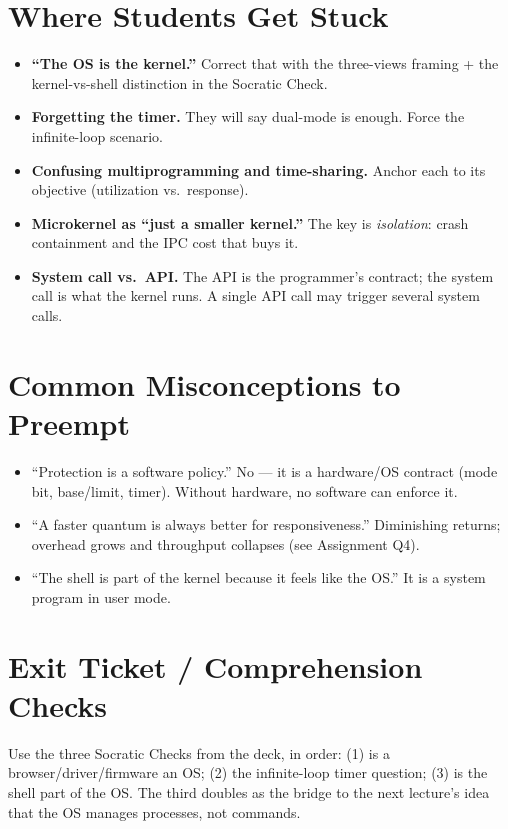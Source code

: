 \documentclass[11pt]{article}
\begin{document}
\section{Where Students Get Stuck}

\begin{itemize}
  \item \textbf{``The OS is the kernel.''} Correct that with the three-views framing + the kernel-vs-shell distinction in the Socratic Check.
  \item \textbf{Forgetting the timer.} They will say dual-mode is enough. Force the infinite-loop scenario.
  \item \textbf{Confusing multiprogramming and time-sharing.} Anchor each to its objective (utilization vs.\ response).
  \item \textbf{Microkernel as ``just a smaller kernel.''} The key is \emph{isolation}: crash containment and the IPC cost that buys it.
  \item \textbf{System call vs.\ API.} The API is the programmer's contract; the system call is what the kernel runs. A single API call may trigger several system calls.
\end{itemize}

\section{Common Misconceptions to Preempt}

\begin{itemize}
  \item ``Protection is a software policy.'' No --- it is a hardware/OS contract (mode bit, base/limit, timer). Without hardware, no software can enforce it.
  \item ``A faster quantum is always better for responsiveness.'' Diminishing returns; overhead grows and throughput collapses (see Assignment Q4).
  \item ``The shell is part of the kernel because it feels like the OS.'' It is a system program in user mode.
\end{itemize}

\section{Exit Ticket / Comprehension Checks}

Use the three Socratic Checks from the deck, in order: (1) is a browser/driver/firmware an OS; (2) the infinite-loop timer question; (3) is the shell part of the OS. The third doubles as the bridge to the next lecture's idea that the OS manages processes, not commands.
\end{document}
